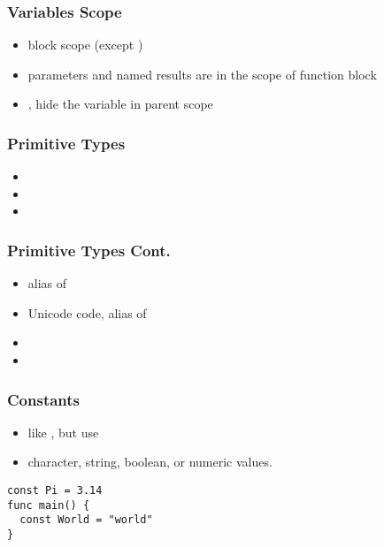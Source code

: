 \documentclass[xetex,mathserif,serif,12pt]{beamer}
\begin{document}
\begin{frame}
  \frametitle{Variables Scope}

  \begin{itemize}
  \item block scope (except )
  \item parameters and named results are in the scope of function block
  \item {}, \hltexttt{:=} hide the variable in parent scope
  \end{itemize}
\end{frame}

\begin{frame}

  \frametitle{Primitive Types}

  \begin{itemize}
  \item {}
  \item {}
  \item
            \newline
        \newline
  \end{itemize}

\end{frame}

\begin{frame}

  \frametitle{Primitive Types Cont.}

  \begin{itemize}
  \item {} alias of 
  \item {} Unicode code, alias of 
  \item {} 
  \item {} 
  \end{itemize}
\end{frame}

\begin{frame}[fragile]
  \frametitle{Constants}

  \begin{itemize}
  \item like , but use 
  \item character, string, boolean, or numeric values.
  \end{itemize}

  \begin{beamer@nomargin}
    \begin{lstlisting}
const Pi = 3.14
func main() {
  const World = "world"
}
    \end{lstlisting}
  \end{beamer@nomargin}
\end{frame}
\end{document}
